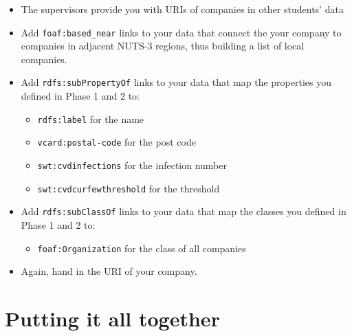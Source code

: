 \documentclass[DIV=12]{scrartcl}
\begin{document}
\begin{itemize}
\item The supervisors provide you with URIs of companies in other students' data
\item Add \nolinkurl{foaf:based_near} links to your data that connect the your company to companies in adjacent NUTS-3 regions, thus building a list of local companies.
\item Add \nolinkurl{rdfs:subPropertyOf} links to your data that map the properties you defined in Phase 1 and 2 to:
\begin{itemize}
\item \nolinkurl{rdfs:label} for the name
\item \nolinkurl{vcard:postal-code} for the post code
\item \nolinkurl{swt:cvdinfections} for the infection number
\item \nolinkurl{swt:cvdcurfewthreshold} for the threshold
\end{itemize} 
\item Add \nolinkurl{rdfs:subClassOf} links to your data that map the classes you defined in Phase 1 and 2 to:
\begin{itemize}
\item \nolinkurl{foaf:Organization} for the class of all companies
\end{itemize}
\item Again, hand in the URI of your company.
\end{itemize} 


\section*{Putting it all together}
\end{document}
